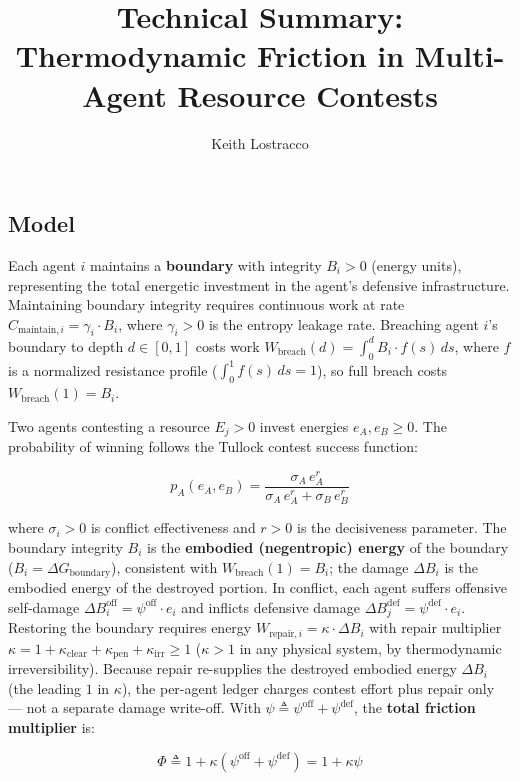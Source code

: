 \documentclass[11pt]{article}
\title{Technical Summary: Thermodynamic Friction in Multi-Agent Resource
Contests}
\author{Keith Lostracco}
\date{}
\begin{document}
\maketitle

\subsection{Model}\label{model}

Each agent \(i\) maintains a \textbf{boundary} with integrity
\(B_i > 0\) (energy units), representing the total energetic investment
in the agent's defensive infrastructure. Maintaining boundary integrity
requires continuous work at rate
\(C_{\text{maintain},i} = \gamma_i \cdot B_i\), where \(\gamma_i > 0\)
is the entropy leakage rate. Breaching agent \(i\)'s boundary to depth
\(d \in [0,1]\) costs work
\(W_{\text{breach}}(d) = \int_0^d B_i \cdot f(s) \, ds\), where \(f\) is
a normalized resistance profile (\(\int_0^1 f(s)\,ds = 1\)), so full
breach costs \(W_{\text{breach}}(1) = B_i\).

Two agents contesting a resource \(E_j > 0\) invest energies
\(e_A, e_B \geq 0\). The probability of winning follows the Tullock
contest success function:

\[p_A(e_A, e_B) = \frac{\sigma_A \, e_A^r}{\sigma_A \, e_A^r + \sigma_B \, e_B^r}\]

where \(\sigma_i > 0\) is conflict effectiveness and \(r > 0\) is the
decisiveness parameter. The boundary integrity \(B_i\) is the
\textbf{embodied (negentropic) energy} of the boundary
(\(B_i = \Delta G_{\text{boundary}}\)), consistent with
\(W_{\text{breach}}(1) = B_i\); the damage \(\Delta B_i\) is the
embodied energy of the destroyed portion. In conflict, each agent
suffers offensive self-damage
\(\Delta B_i^{\text{off}} = \psi^{\text{off}} \cdot e_i\) and inflicts
defensive damage
\(\Delta B_j^{\text{def}} = \psi^{\text{def}} \cdot e_i\). Restoring the
boundary requires energy
\(W_{\text{repair},i} = \kappa \cdot \Delta B_i\) with repair multiplier
\(\kappa = 1 + \kappa_{\text{clear}} + \kappa_{\text{pen}} + \kappa_{\text{irr}} \geq 1\)
(\(\kappa > 1\) in any physical system, by thermodynamic
irreversibility). Because repair re-supplies the destroyed embodied
energy \(\Delta B_i\) (the leading \(1\) in \(\kappa\)), the per-agent
ledger charges contest effort plus repair only --- not a separate damage
write-off. With
\(\psi \triangleq \psi^{\text{off}} + \psi^{\text{def}}\), the
\textbf{total friction multiplier} is:

\[\Phi \triangleq 1 + \kappa(\psi^{\text{off}} + \psi^{\text{def}}) = 1 + \kappa\psi\]
\end{document}
